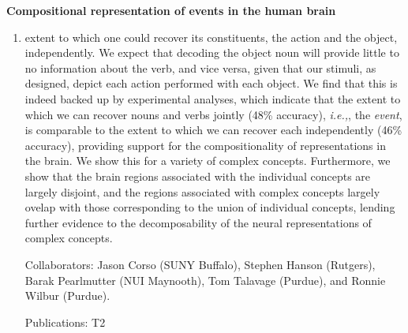 \documentclass[10pt]{article}
\newenvironment{researchBlock}[1]{%
  \vspace*{0.5ex}
  {\large \textbf{#1}}
  \begin{enumerate}\item[]}
  {\end{enumerate}}
\newcommand{\refr}[1]{{\color{RoyalBlue} #1}}
\newcommand{\ie}{\emph{i.e.,}}
\begin{document}
\begin{researchBlock} {Compositional representation of events in the human brain}
  extent to which one could recover its constituents, the action and the
  object, independently.
  We expect that decoding the object noun will provide little to no information
  about the verb, and vice versa, given that our stimuli, as designed, depict
  each action performed with each object.
  We find that this is indeed backed up by experimental analyses, which
  indicate that the extent to which we can recover nouns and verbs jointly
  (48\% accuracy), \ie, the \emph{event}, is comparable to the extent to which
  we can recover each independently (46\% accuracy), providing support for the
  compositionality of representations in the brain.
  We show this for a variety of complex concepts.
  Furthermore, we show that the brain regions associated with the individual
  concepts are largely disjoint, and the regions associated with complex
  concepts largely ovelap with those corresponding to the union of individual
  concepts, lending further evidence to the decomposability of the neural
  representations of complex concepts.

  Collaborators: Jason Corso (SUNY Buffalo), Stephen Hanson (Rutgers), Barak Pearlmutter (NUI Maynooth),
  Tom Talavage (Purdue), and Ronnie Wilbur (Purdue).

  Publications: \refr{T2}
\end{researchBlock}
\end{document}

